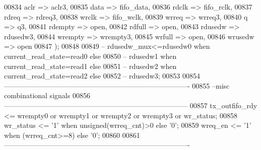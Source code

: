 \begin{DoxyCode}
00834         aclr            => aclr3,
00835         data            => fifo_data, 
00836         rdclk          => fifo_rclk,
00837         rdreq          => rdreq3,
00838         wrclk          => fifo_wclk, 
00839         wrreq          => wrreq3, 
00840         q             => q3, 
00841         rdempty     => \textcolor{keywordflow}{open},
00842         rdfull      => \textcolor{keywordflow}{open},
00843         rdusedw     => rdusedw3,
00844         wrempty     => wrempty3,
00845         wrfull      => \textcolor{keywordflow}{open}, 
00846         wrusedw     => \textcolor{keywordflow}{open}
00847   \textcolor{vhdlchar}{)};
00848   
00849 \textcolor{keyword}{--   rdusedw\_mux<=rdusedw0 when current\_read\_state=read0 else }
00850 \textcolor{keyword}{--                rdusedw1 when current\_read\_state=read1 else }
00851 \textcolor{keyword}{--                rdusedw2 when current\_read\_state=read2 else }
00852 \textcolor{keyword}{--                rdusedw3;}
00853 
00854 \textcolor{keyword}{-------------------------------------------------------------------------------}
00855 \textcolor{keyword}{--misc combinational signals}
00856 \textcolor{keyword}{------------------------------------------------------------------------------   }
00857 \textcolor{vhdlchar}{tx_outfifo_rdy}  \textcolor{vhdlchar}{<=}  \textcolor{vhdlchar}{wrempty0} \textcolor{keywordflow}{or} \textcolor{vhdlchar}{wrempty1} \textcolor{keywordflow}{or} \textcolor{vhdlchar}{wrempty2} \textcolor{keywordflow}{or} \textcolor{vhdlchar}{wrempty3} \textcolor{keywordflow}{or} \textcolor{vhdlchar}{wr_status};
00858 \textcolor{vhdlchar}{wr_status}       \textcolor{vhdlchar}{<=} \textcolor{vhdlchar}{'}\textcolor{vhdllogic}{}\textcolor{vhdllogic}{1}\textcolor{vhdlchar}{'} \textcolor{keywordflow}{when} \textcolor{comment}{unsigned}\textcolor{vhdlchar}{(}\textcolor{vhdlchar}{wrreq_cnt}\textcolor{vhdlchar}{)}\textcolor{vhdlchar}{>}\textcolor{vhdllogic}{}\textcolor{vhdllogic}{0} \textcolor{keywordflow}{else} \textcolor{vhdlchar}{'}\textcolor{vhdllogic}{}\textcolor{vhdllogic}{0}\textcolor{vhdlchar}{'};
00859 \textcolor{vhdlchar}{wreq_en}         \textcolor{vhdlchar}{<=} \textcolor{vhdlchar}{'}\textcolor{vhdllogic}{}\textcolor{vhdllogic}{1}\textcolor{vhdlchar}{'} \textcolor{keywordflow}{when}  \textcolor{vhdlchar}{(}\textcolor{vhdlchar}{wrreq_cnt}\textcolor{vhdlchar}{>=}\textcolor{vhdllogic}{}\textcolor{vhdllogic}{8}\textcolor{vhdlchar}{)} \textcolor{keywordflow}{else} \textcolor{vhdlchar}{'}\textcolor{vhdllogic}{}\textcolor{vhdllogic}{0}\textcolor{vhdlchar}{'}; 
00860     
00861 \textcolor{keyword}{-------------------------------------------------------------------------------}

\end{DoxyCode}
